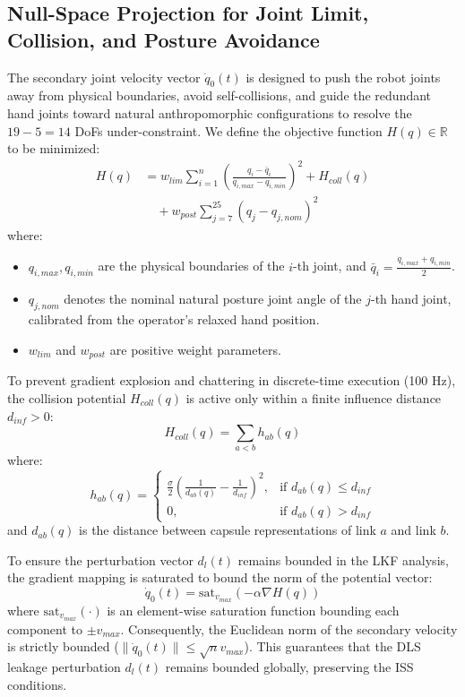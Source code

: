 \documentclass[letterpaper,journal]{IEEEtran}
\begin{document}
\subsection{Null-Space Projection for Joint Limit, Collision, and Posture Avoidance}
The secondary joint velocity vector $\dot{q}_0(t)$ is designed to push the robot joints away from physical boundaries, avoid self-collisions, and guide the redundant hand joints toward natural anthropomorphic configurations to resolve the $19 - 5 = 14$ DoFs under-constraint. We define the objective function $H(q) \in \mathbb{R}$ to be minimized:
\begin{equation}
\begin{split}
H(q) &= w_{lim} \sum_{i=1}^{n} \left( \frac{q_i - \bar{q}_i}{q_{i,max} - q_{i,min}} \right)^2 + H_{coll}(q) \\
&\quad + w_{post} \sum_{j=7}^{25} \left( q_j - q_{j,nom} \right)^2
\end{split}
\end{equation}
where:
\begin{itemize}
\item $q_{i,max}, q_{i,min}$ are the physical boundaries of the $i$-th joint, and $\bar{q}_i = \frac{q_{i,max} + q_{i,min}}{2}$.
\item $q_{j,nom}$ denotes the nominal natural posture joint angle of the $j$-th hand joint, calibrated from the operator's relaxed hand position.
\item $w_{lim}$ and $w_{post}$ are positive weight parameters.
\end{itemize}

To prevent gradient explosion and chattering in discrete-time execution (100 Hz), the collision potential $H_{coll}(q)$ is active only within a finite influence distance $d_{inf} > 0$:
\begin{equation}
H_{coll}(q) = \sum_{a < b} h_{ab}(q)
\end{equation}
where:
\begin{equation*}
h_{ab}(q) = \begin{cases}
\frac{\sigma}{2} \left( \frac{1}{d_{ab}(q)} - \frac{1}{d_{inf}} \right)^2, & \text{if } d_{ab}(q) \le d_{inf} \\
0, & \text{if } d_{ab}(q) > d_{inf}
\end{cases}
\end{equation*}
and $d_{ab}(q)$ is the distance between capsule representations of link $a$ and link $b$.

To ensure the perturbation vector $d_l(t)$ remains bounded in the LKF analysis, the gradient mapping is saturated to bound the norm of the potential vector:
\begin{equation}
\dot{q}_0(t) = \text{sat}_{v_{max}} \left( -\alpha \nabla H(q) \right)
\end{equation}
where $\text{sat}_{v_{max}}(\cdot)$ is an element-wise saturation function bounding each component to $\pm v_{max}$. Consequently, the Euclidean norm of the secondary velocity is strictly bounded ($\| \dot{q}_0(t) \| \le \sqrt{n} v_{max}$). This guarantees that the DLS leakage perturbation $d_l(t)$ remains bounded globally, preserving the ISS conditions.
\end{document}
